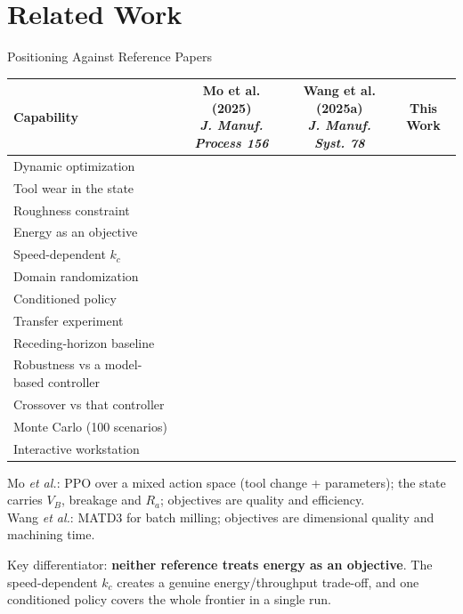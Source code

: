 \documentclass[11pt,aspectratio=169]{beamer}
\newcommand{\Ra}{R_a}
\newcommand{\VB}{V_B}
\newcommand{\CMark}{\ding{51}}
\newcommand{\XMark}{\ding{55}}
\begin{document}
\section{Related Work}

\begin{frame}{Positioning Against Reference Papers}
    \begin{table}
    \centering
    \label{tab:papers}
    \scriptsize
    \begin{tabular}{@{}lccc@{}}
    \toprule
\textbf{Capability} & \makecell{Mo et al. (2025)\\\textsl{J. Manuf. Process 156}} & \makecell{Wang et al. (2025a)\\\textsl{J. Manuf. Syst. 78}} & \textbf{This Work} \\
    \midrule
    Dynamic optimization & \CMark & \CMark & \CMark \\
    Tool wear in the state & \CMark & \XMark & \CMark \\
    Roughness constraint & \CMark & \XMark & \CMark \\
    Energy as an objective & \XMark & \XMark & \CMark \\
    Speed-dependent $k_c$ & \XMark & \XMark & \CMark \\
    Domain randomization & \XMark & \XMark & \CMark \\
    Conditioned policy & \XMark & \XMark & \CMark \\
    Transfer experiment & \XMark & \XMark & \CMark \\
    Receding-horizon baseline & \XMark & \XMark & \CMark \\
    Robustness vs a model-based controller & \XMark & \XMark & \CMark \\
Crossover vs that controller & \XMark & \XMark & \CMark \\
    Monte Carlo (100 scenarios) & \XMark & \XMark & \CMark \\
    Interactive workstation & \XMark & \XMark & \CMark \\
    \bottomrule
    \end{tabular}
    \end{table}

    \vspace{0.1em}
    \scriptsize
    Mo \emph{et al.}: PPO over a mixed action space (tool change + parameters); the state carries
    $\VB$, breakage and $\Ra$; objectives are quality and efficiency.\\
    Wang \emph{et al.}: MATD3 for batch milling; objectives are dimensional quality and machining time.

    \vspace{0.1em}
    \alert{Key differentiator:} \textbf{neither reference treats energy as an objective}. The
    speed-dependent $k_c$ creates a genuine energy/throughput trade-off, and one conditioned
    policy covers the whole frontier in a single run.
\end{frame}
\end{document}
